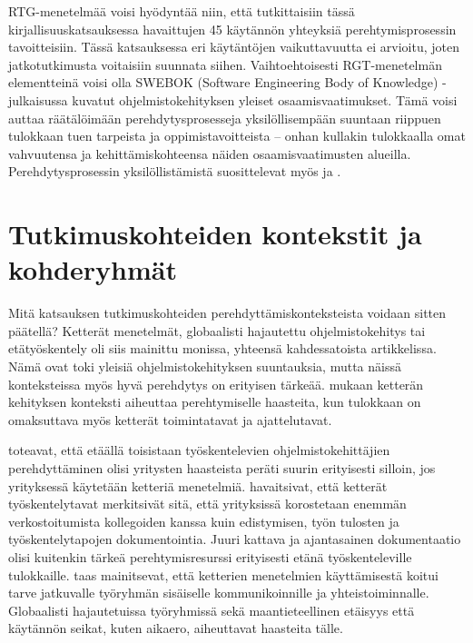 \documentclass[utf8]{gradu3}
\begin{document}
RTG-menetelmää voisi hyödyntää niin, että tutkittaisiin tässä kirjallisuuskatsauksessa havaittujen 45 käytännön yhteyksiä perehtymisprosessin tavoitteisiin. Tässä katsauksessa eri käytäntöjen vaikuttavuutta ei arvioitu, joten jatkotutkimusta voitaisiin suunnata siihen. Vaihtoehtoisesti RGT-menetelmän elementteinä voisi olla SWEBOK (Software Engineering Body of Knowledge) -julkaisussa \parencite{swebok} kuvatut ohjelmistokehityksen yleiset osaamisvaatimukset. Tämä voisi auttaa räätälöimään perehdytysprosesseja yksilöllisempään suuntaan riippuen tulokkaan tuen tarpeista ja oppimistavoitteista -- onhan kullakin tulokkaalla omat vahvuutensa ja kehittämiskohteensa näiden osaamisvaatimusten alueilla. Perehdytysprosessin yksilöllistämistä suosittelevat myös \textcite{britto-ym-2017} ja \textcite{rodeghero-ym-2021}.

\section{Tutkimuskohteiden kontekstit ja kohderyhmät}

Mitä katsauksen tutkimuskohteiden perehdyttämiskonteksteista voidaan sitten päätellä? Ketterät menetelmät, globaalisti hajautettu ohjelmistokehitys tai etätyöskentely oli siis mainittu monissa, yhteensä kahdessatoista artikkelissa. Nämä ovat toki yleisiä ohjelmistokehityksen suuntauksia, mutta näissä konteksteissa myös hyvä perehdytys on erityisen tärkeää. \textcite{gregory-ym-2020} mukaan ketterän kehityksen konteksti aiheuttaa perehtymiselle haasteita, kun tulokkaan on omaksuttava myös ketterät toimintatavat ja ajattelutavat. 

\textcite{britto-ym-2017} toteavat, että etäällä toisistaan työskentelevien ohjelmistokehittäjien perehdyttäminen olisi yritysten haasteista peräti suurin erityisesti silloin, jos yrityksessä käytetään ketteriä menetelmiä. \textcite{britto-ym-2017} havaitsivat, että ketterät työskentelytavat merkitsivät sitä, että yrityksissä korostetaan enemmän verkostoitumista kollegoiden kanssa kuin edistymisen, työn tulosten ja työskentelytapojen dokumentointia. Juuri kattava ja ajantasainen dokumentaatio olisi kuitenkin tärkeä perehtymisresurssi erityisesti etänä työskenteleville tulokkaille. \textcite{moe-ym-2020} taas mainitsevat, että ketterien menetelmien käyttämisestä koitui tarve jatkuvalle työryhmän sisäiselle kommunikoinnille ja yhteistoiminnalle. Globaalisti hajautetuissa työryhmissä sekä maantieteellinen etäisyys että käytännön seikat, kuten aikaero, aiheuttavat haasteita tälle.
\end{document}
